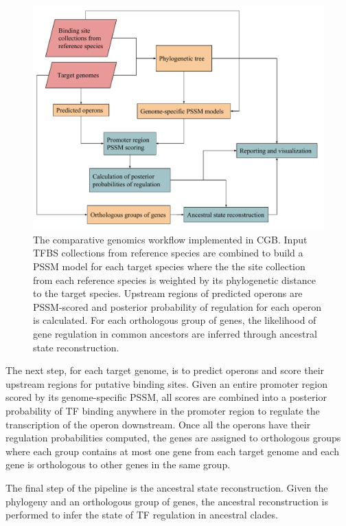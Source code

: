 \documentclass[12pt]{article}
\begin{document}
\begin{figure}
  \centering
  \includegraphics[width=\textwidth]{figures/chapter4/cgb_workflow}
  \caption{The comparative genomics workflow implemented in CGB\@. Input TFBS
    collections from reference species are combined to build a PSSM model for
    each target species where the the site collection from each reference
    species is weighted by its phylogenetic distance to the target
    species. Upstream regions of predicted operons are PSSM-scored and
    posterior probability of regulation for each operon is calculated. For each
    orthologous group of genes, the likelihood of gene regulation in common
    ancestors are inferred through ancestral state reconstruction.}
  \label{fig:pipeline}
\end{figure}

The next step, for each target genome, is to predict operons and score their
upstream regions for putative binding sites. Given an entire promoter region
scored by its genome-specific PSSM, all scores are combined into a posterior
probability of TF binding anywhere in the promoter region to regulate the
transcription of the operon downstream. Once all the operons have their
regulation probabilities computed, the genes are assigned to orthologous groups
where each group contains at most one gene from each target genome and each
gene is orthologous to other genes in the same group.

The final step of the pipeline is the ancestral state reconstruction. Given the
phylogeny and an orthologous group of genes, the ancestral reconstruction is
performed to infer the state of TF regulation in ancestral clades.
\end{document}
